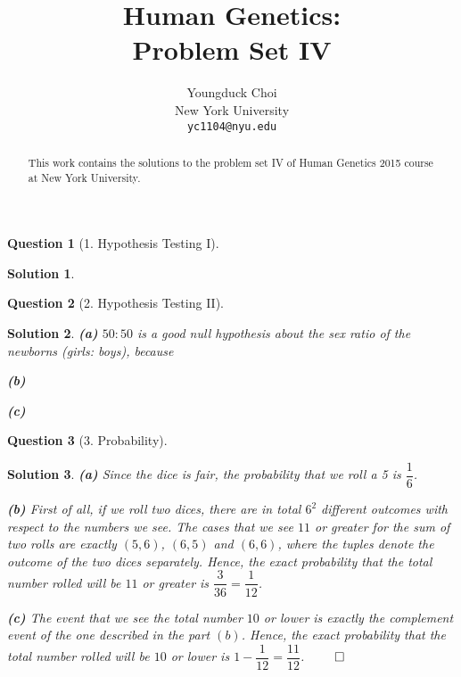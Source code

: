 \documentclass{article} %
\title{Human Genetics: \\
Problem Set IV}
\author{
Youngduck Choi \\
New York University\\
\texttt{yc1104@nyu.edu} \\
}
\theoremstyle{quest}
\newtheorem*{question}{Question}
\newtheorem*{solution}{Solution}
\begin{document}
\maketitle

\begin{abstract}
This work contains the solutions to the problem set IV
of Human Genetics 2015 course at New York University.
\end{abstract}

\begin{question}[1. Hypothesis Testing I]
\end{question}
\begin{solution}

\end{solution}

\bigskip

\begin{question}[2. Hypothesis Testing II]
\end{question}
\begin{solution}
\textbf{(a)} $50:50$ is a good null hypothesis about the sex ratio of the newborns (girls: boys),
because 

\smallskip

\textbf{(b)} 

\smallskip

\textbf{(c)} 

\smallskip

\end{solution}

\bigskip

\begin{question}[3. Probability]
\end{question}
\begin{solution}
\textbf{(a)} Since the dice is fair, the probability that we roll a 5 is $\dfrac{1}{6}$.

\smallskip

\textbf{(b)} First of all, if we roll two dices, there are in total $6^2$ different 
outcomes with respect to the numbers we see. The cases that we see $11$ or greater for 
the sum of two rolls are exactly $(5,6)$, $(6,5)$ and $(6,6)$, where the tuples denote
the outcome of the two dices separately. Hence, the exact probability that the total
number rolled will be $11$ or greater is $\dfrac{3}{36} = \dfrac{1}{12}$. 

\smallskip

\textbf{(c)} The event that we see the total number $10$ or lower is exactly the complement event
of the one described in the part $(b)$. Hence, the exact probability that the total
number rolled will be $10$ or lower is $1 - \dfrac{1}{12} = \dfrac{11}{12}$. $\qed$

\end{solution}
\end{document}
